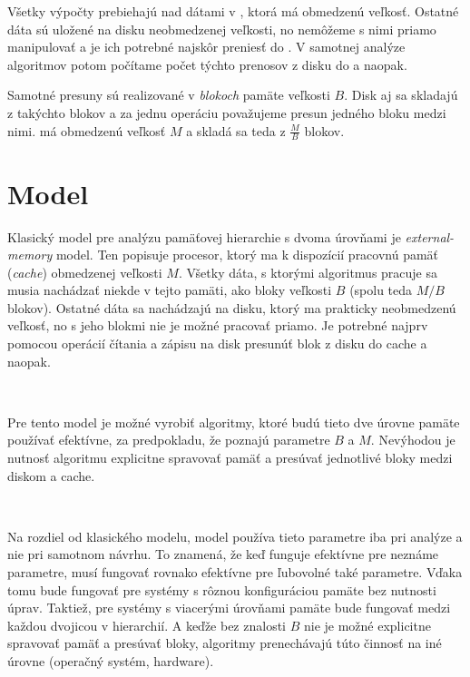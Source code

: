 Všetky výpočty prebiehajú nad dátami v \cache, ktorá má obmedzenú veľkosť. Ostatné dáta sú uložené na disku neobmedzenej veľkosti, no nemôžeme s nimi priamo manipulovať a je ich potrebné najskôr preniesť do \cache. V samotnej analýze algoritmov potom počítame počet týchto prenosov z disku do \cache a naopak.

Samotné presuny sú realizované v \emph{blokoch} pamäte veľkosti $B$. Disk aj \cache sa skladajú z takýchto blokov a za jednu operáciu považujeme presun jedného bloku medzi nimi. \Cache má obmedzenú veľkosť $M$ a skladá sa teda z $\frac{M}{B}$ blokov.  









\section{Model}
Klasický model pre analýzu pamäťovej hierarchie s dvoma úrovňami je {\em external-memory} model. Ten popisuje procesor, ktorý ma k dispozícií pracovnú pamäť ({\em cache}) obmedzenej veľkosti $M$. Všetky dáta, s ktorými algoritmus pracuje sa musia nachádzať niekde v tejto pamäti, ako bloky veľkosti $B$ (spolu teda $M/B$ blokov). Ostatné dáta sa nachádzajú na disku, ktorý ma prakticky neobmedzenú veľkosť, no s jeho blokmi nie je možné pracovať priamo. Je potrebné najprv pomocou operácií čítania a zápisu na disk presunúť blok z disku do cache a naopak.

\

Pre tento model je možné vyrobiť algoritmy, ktoré budú tieto dve úrovne pamäte používať efektívne, za predpokladu, že poznajú parametre $B$ a $M$. Nevýhodou je nutnosť algoritmu explicitne spravovať pamäť a presúvať jednotlivé bloky medzi diskom a cache.

\

Na rozdiel od klasického modelu, \obliv model používa tieto parametre iba pri analýze a nie pri samotnom návrhu. To znamená, že keď funguje efektívne pre neznáme parametre, musí fungovať rovnako efektívne pre ľubovolné také parametre. Vďaka tomu bude fungovať pre systémy s rôznou konfiguráciou pamäte bez nutnosti úprav. Taktiež, pre systémy s viacerými úrovňami pamäte bude fungovať medzi každou dvojicou v hierarchií. A keďže bez znalosti $B$ nie je možné explicitne spravovať pamäť a presúvať bloky, \obliv algoritmy prenechávajú túto činnosť na iné úrovne (operačný systém, hardware).

